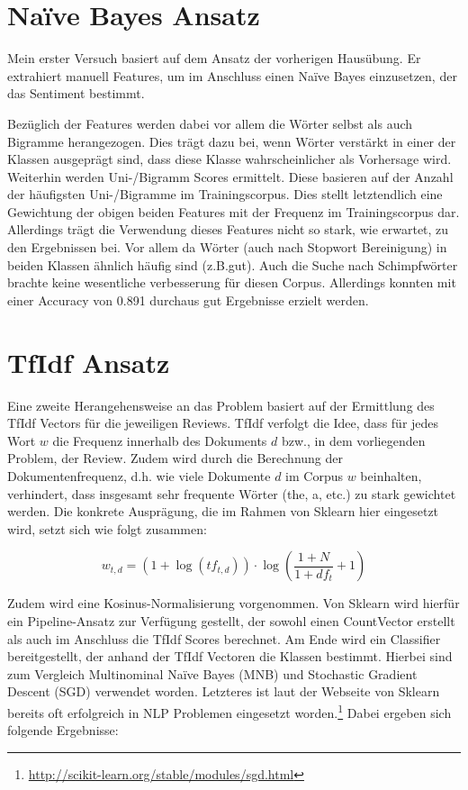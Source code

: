 \documentclass[12pt]{scrartcl}
\begin{document}
    \section{Naïve Bayes Ansatz}\label{sec:naiveBayesApproach}
    Mein erster Versuch basiert auf dem Ansatz der vorherigen Hausübung.
    Er extrahiert manuell Features, um im Anschluss einen Naïve Bayes einzusetzen, der das Sentiment bestimmt.

    Bezüglich der Features werden dabei vor allem die Wörter selbst als auch Bigramme herangezogen.
    Dies trägt dazu bei, wenn Wörter verstärkt in einer der Klassen ausgeprägt sind, dass diese Klasse wahrscheinlicher als Vorhersage wird.
    Weiterhin werden Uni-/Bigramm Scores ermittelt.
    Diese basieren auf der Anzahl der häufigsten Uni-/Bigramme im Trainingscorpus.
    Dies stellt letztendlich eine Gewichtung der obigen beiden Features mit der Frequenz im Trainingscorpus dar.
    Allerdings trägt die Verwendung dieses Features nicht so stark, wie erwartet, zu den Ergebnissen bei.
    Vor allem da Wörter (auch nach Stopwort Bereinigung) in beiden Klassen ähnlich häufig sind (z.B.\glqq{}gut\grqq{}).
    Auch die Suche nach Schimpfwörter brachte keine wesentliche verbesserung für diesen Corpus.
    Allerdings konnten mit einer Accuracy von 0.891 durchaus gut Ergebnisse erzielt werden.

    \section{TfIdf Ansatz}\label{sec:tfidfAnsatz}
    Eine zweite Herangehensweise an das Problem basiert auf der Ermittlung des TfIdf Vectors für die jeweiligen Reviews.
    TfIdf verfolgt die Idee, dass für jedes Wort $w$ die Frequenz innerhalb des Dokuments $d$ bzw., in dem vorliegenden Problem, der Review.
    Zudem wird durch die Berechnung der Dokumentenfrequenz, d.h. wie viele Dokumente $d$ im Corpus $w$ beinhalten, verhindert,
    dass insgesamt sehr frequente Wörter (the, a, etc.) zu stark gewichtet werden.
    Die konkrete Ausprägung, die im Rahmen von Sklearn hier eingesetzt wird, setzt sich wie folgt zusammen:

    \begin{equation}
        w_{t,d} = \left(1 + \log\left(tf_{t,d}\right)\right) \cdot \log\left(\frac{1 + N}{1 + df_{t}} + 1\right)
    \end{equation}

    Zudem wird eine Kosinus-Normalisierung vorgenommen.
    Von Sklearn wird hierfür ein Pipeline-Ansatz zur Verfügung gestellt,
    der sowohl einen CountVector erstellt als auch im Anschluss die TfIdf Scores berechnet.
    Am Ende wird ein Classifier bereitgestellt, der anhand der TfIdf Vectoren die Klassen bestimmt.
    Hierbei sind zum Vergleich Multinominal Naïve Bayes (MNB) und Stochastic Gradient Descent (SGD) verwendet worden.
    Letzteres ist laut der Webseite von Sklearn bereits oft erfolgreich in NLP Problemen eingesetzt worden.\footnote{\url{http://scikit-learn.org/stable/modules/sgd.html}}
    Dabei ergeben sich folgende Ergebnisse:
\end{document}
